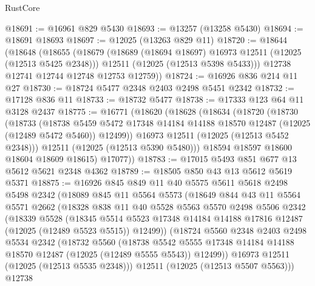 \begin{lexlean}{RustCore}
\begin{coremodule}
@18691 := @16961 @829 @5430
@18693 := @13257 (@13258 @5430)
@18694 := @18691 @18693
@18697 := @12025 (@13263 @829 @11)
@18720 := @18644
    (@18648
      (@18655
        (@18679
          (@18689 (@18694 @18697) @16973 @12511 (@12025 (@12513 @5425 @2348)))
          @12511
          (@12025 (@12513 @5398 @5433)))
        @12738
        @12741
        @12744
        @12748
        @12753
        @12759))
@18724 := @16926 @836 @214 @11 @27
@18730 := @18724 @5477 @2348 @2403 @2498 @5451 @2342
@18732 := @17128 @836 @11
@18733 := @18732 @5477
@18738 := @17333 @123 @64 @11 @3128 @2437
@18775 := @16771
    (@18620
      (@18628
        (@18634
          (@18720
            (@18730
              (@18733
                (@18738
                  @5459
                  @5472
                  @17348
                  @14184
                  @14188
                  @18570
                  @12487
                  (@12025 (@12489 @5472 @5460))
                  @12499))
              @16973
              @12511
              (@12025 (@12513 @5452 @2348)))
            @12511
            (@12025 (@12513 @5390 @5480)))
          @18594
          @18597
          @18600
          @18604
          @18609
          @18615)
        @17077))
@18783 := @17015 @5493 @851 @677 @13 @5612 @5621 @2348 @4362
@18789 := @18505 @850 @43 @13 @5612 @5619 @5371
@18875 := @16926
    @845
    @849
    @11
    @40
    @5575
    @5611
    @5618
    @2498
    @5498
    @2342
    (@18089
      @845
      @11
      @5564
      @5573
      (@18649
        @844
        @43
        @11
        @5564
        @5571
        @2662
        (@18328
          @838
          @11
          @40
          @5528
          @5563
          @5570
          @2498
          @5506
          @2342
          (@18339
            @5528
            (@18345
              @5514
              @5523
              @17348
              @14184
              @14188
              @17816
              @12487
              (@12025 (@12489 @5523 @5515))
              @12499))
          (@18724
            @5560
            @2348
            @2403
            @2498
            @5534
            @2342
            (@18732
              @5560
              (@18738
                @5542
                @5555
                @17348
                @14184
                @14188
                @18570
                @12487
                (@12025 (@12489 @5555 @5543))
                @12499))
            @16973
            @12511
            (@12025 (@12513 @5535 @2348)))
          @12511
          (@12025 (@12513 @5507 @5563)))
        @12738

\end{coremodule}
\end{lexlean}
